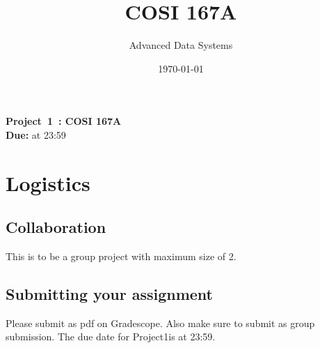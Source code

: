 \documentclass[12pt,a4paper,twoside]{article}
\title{COSI 167A}
\author{Advanced Data Systems}
\date{\today}
\newcommand{\assignmenttype}{Project}       %
\newcommand{\assignmentnumber}{1}           %
\newcommand{\coursename}{COSI 167A}         %
\newcommand{\smallspace}{0.2cm}
\begin{document}
\begin{center}
    \textbf{\assignmenttype\ \assignmentnumber\ \:: \coursename}\\
    \vspace{\smallspace}
    \textbf{Due:}  at 23:59
\end{center}




\section{Logistics}
\subsection{Collaboration}
This is to be a group project with maximum size of 2.

\subsection{Submitting your assignment}
Please submit as pdf on Gradescope. Also make sure to submit as group submission. 
The due date for \assignmenttype \assignmentnumber is  at 23:59.


\end{document}
